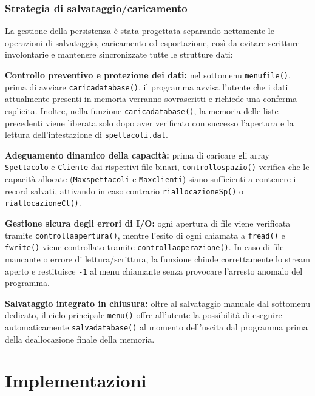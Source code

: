 \documentclass[11pt,a4paper,oneside,openany]{book}
\newenvironment{listacomp}{%
    \small
    \begin{list}{\textendash}{%
        \setlength{\topsep}{2pt}%
        \setlength{\partopsep}{0pt}%
        \setlength{\itemsep}{1pt}%
        \setlength{\parsep}{0pt}%
        \setlength{\leftmargin}{1.2em}%
    }%
}{%
    \end{list}%
}
\begin{document}
\subsection{Strategia di salvataggio/caricamento}
La gestione della persistenza è stata progettata separando nettamente le operazioni di salvataggio, caricamento ed esportazione, così da evitare scritture involontarie e mantenere sincronizzate tutte le strutture dati:
\begin{listacomp}
    \item \textbf{Controllo preventivo e protezione dei dati:} nel sottomenu \texttt{menufile()}, prima di avviare \texttt{caricadatabase()}, il programma avvisa l'utente che i dati attualmente presenti in memoria verranno sovrascritti e richiede una conferma esplicita. Inoltre, nella funzione \texttt{caricadatabase()}, la memoria delle liste precedenti viene liberata solo dopo aver verificato con successo l'apertura e la lettura dell'intestazione di \texttt{spettacoli.dat}.
    \item \textbf{Adeguamento dinamico della capacità:} prima di caricare gli array \texttt{Spettacolo} e \texttt{Cliente} dai rispettivi file binari, \texttt{controllospazio()} verifica che le capacità allocate (\texttt{Maxspettacoli} e \texttt{Maxclienti}) siano sufficienti a contenere i record salvati, attivando in caso contrario \texttt{riallocazioneSp()} o \texttt{riallocazioneCl()}.
    \item \textbf{Gestione sicura degli errori di I/O:} ogni apertura di file viene verificata tramite \texttt{controllaapertura()}, mentre l'esito di ogni chiamata a \texttt{fread()} e \texttt{fwrite()} viene controllato tramite \texttt{controllaoperazione()}. In caso di file mancante o errore di lettura/scrittura, la funzione chiude correttamente lo stream aperto e restituisce \texttt{-1} al menu chiamante senza provocare l'arresto anomalo del programma.
    \item \textbf{Salvataggio integrato in chiusura:} oltre al salvataggio manuale dal sottomenu dedicato, il ciclo principale \texttt{menu()} offre all'utente la possibilità di eseguire automaticamente \texttt{salvadatabase()} al momento dell'uscita dal programma prima della deallocazione finale della memoria.
\end{listacomp}

\chapter{Implementazioni}
\end{document}

